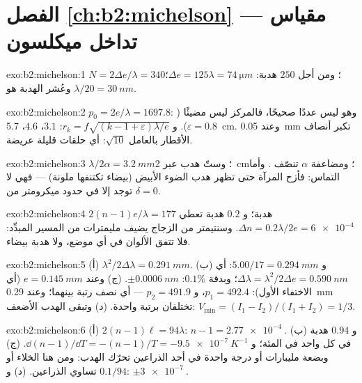 \section*{الفصل \ref{ch:b2:michelson} --- مقياس تداخل ميكلسون}

\begin{solution}{exo:b2:michelson:1}
$N = 2\Delta e/\lambda = 340$؛ ومن أجل $250$ هدبة: $\Delta e = 125\lambda = \qty{74}{\micro m}$؛ وعُشر
الهدبة هو $\lambda/20 = \qty{30}{nm}$.
\end{solution}

\begin{solution}{exo:b2:michelson:2}
$p_0 = 2e/\lambda = 1697.8$: وهو ليس عددًا صحيحًا، فالمركز ليس مضيئًا ($\varepsilon =
0.8$). و $r_k = f\sqrt{(k - 1 + \varepsilon)\lambda/e}$: $3.1$، $4.6$، \qty{5.7}{cm}. وعند \qty{0.05}{mm} تكبر
أنصاف الأقطار بالعامل $\sqrt{10}$: أي حلقات قليلة عريضة.
\end{solution}

\begin{solution}{exo:b2:michelson:3}
$\lambda/2\alpha = \qty{3.2}{mm}$؛ وستّ هدب عبر \qty{2}{cm}؛ ومضاعفة $\alpha$ تنصّف
. وأما التماس: فأزح المرآة حتى تظهر هدب الضوء الأبيض
(بيضاء تكتنفها ملونة) --- فهي لا توجد إلا في حدود
ميكرومتر من $\delta = 0$.
\end{solution}

\begin{solution}{exo:b2:michelson:4}
$2(n - 1)e/\lambda = 177$ هدبة؛ و $0.2$ هدبة تعطي $\Delta n = 0.2\lambda/2e = \qty{6e-4}{}$.
وسنتيمتر من الزجاج يضيف مليمترات من المسير المبدِّد: فلا تتفق الألوان
في أي موضع، ولا هدبة بيضاء.
\end{solution}

\begin{solution}{exo:b2:michelson:5}
(أ) $\lambda^2/2\Delta\lambda = \qty{0.291}{mm}$. (ب) و $5.00/17 = \qty{0.294}{mm}$: أي $\Delta\lambda = \lambda^2/2\Delta e =
\qty{0.590}{nm}$؛ وبدقة $0.1\%$: $\pm\qty{0.0006}{nm}$. (ج) وعند $e = \qty{0.145}{mm}$ (أي الاختفاء
الأول): $p_1 = 492.4$، و $p_2 = 491.9$ --- أي نصف رتبة بينهما؛ وعند
\qty{0.29}{mm} تختلفان برتبة واحدة. (د) وتبقى الهدب الأضعف: $V_{\min} =
(I_1 - I_2)/(I_1 + I_2) = 1/3$.
\end{solution}

\begin{solution}{exo:b2:michelson:6}
(أ) $2(n - 1)\ell = 94\lambda$: $n - 1 = \qty{2.77e-4}{}$. (ب) و $0.94$ هدبة في كل واحد في المئة؛
و $\dd(n - 1)/\dd T = -(n - 1)/T = \qty{-9.5e-7}{K^{-1}}$. (ج) وبضعة مليبارات أو
درجة واحدة في أحد الذراعين تحرّك الهدب: ومن هنا الخلاء أو تساوي الذراعين. (د)
و $0.1/94$: $\pm\qty{3e-7}{}$.
\end{solution}

